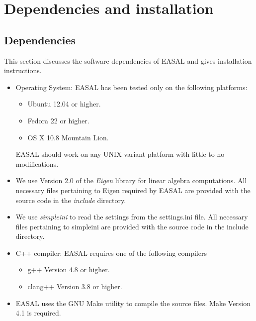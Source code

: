 \documentclass[10pt]{article}
\begin{document}
\section{Dependencies and installation}
\label{sec:dependency}
\subsection{Dependencies}
\label{sec:dependency}
This section discusses the software dependencies of EASAL and gives installation instructions.

\begin{itemize} 
  \item Operating System: EASAL has been tested only on the following platforms:
	\begin{itemize}
	\item Ubuntu 12.04 or higher.
	\item Fedora 22 or higher.
	\item OS X 10.8 Mountain Lion.
	\end{itemize}
	  EASAL should work on any UNIX variant platform with little to no modifications.

  \item We use Version 2.0 of the \emph{Eigen} library for linear algebra
		  computations. All necessary files pertaining to Eigen required by
		  EASAL are provided with the source code in the \emph{include}
		  directory.  
   
  \item We use \emph{simpleini} to read the settings from the
		  settings.ini file. All necessary files pertaining to simpleini are
		  provided with the source code in the include directory.
   
  \item C++ compiler: EASAL requires one of the following compilers
		  \begin{itemize}
		  	\item g++ Version 4.8 or higher.
		  	\item clang++ Version 3.8 or higher.
		  \end{itemize}
		  
  \item EASAL uses the GNU Make utility to compile the source files. Make
		  Version 4.1 is required.
\end{itemize}

 
\end{document}

